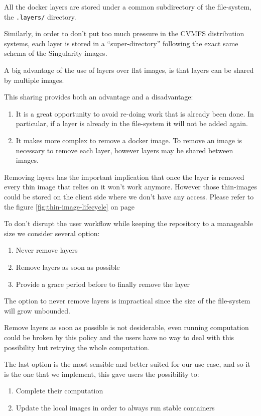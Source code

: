 All the docker layers are stored under a common subdirectory of the file-system, the \texttt{.layers/} directory.

Similarly, in order to don’t put too much pressure in the CVMFS distribution systems, each layer is stored in a “super-directory” following the exact same schema of the Singularity images.

A big advantage of the use of layers over flat images, is that layers can be shared by multiple images.

This sharing provides both an advantage and a disadvantage:
\begin{enumerate}
        \item It is a great opportunity to avoid re-doing work that is already been done. In particular, if a layer is already in the file-system it will not be added again.
        \item It makes more complex to remove a docker image. To remove an image is necessary to remove each layer, however layers may be shared between images.
\end{enumerate}

Removing layers has the important implication that once the layer is removed every thin image that relies on it won’t work anymore.
However those thin-images could be stored on the client side where we don’t have any access.
Please refer to the figure \ref{fig:thin-image-lifecycle} on page \pageref{fig:thin-image-lifecycle}

To don't disrupt the user workflow while keeping the repository to a manageable size we consider several option:
\begin{enumerate}
\item Never remove layers
\item Remove layers as soon as possible
\item Provide a grace period before to finally remove the layer
\end{enumerate}

The option to never remove layers is impractical since the size of the file-system will grow unbounded.

Remove layers as soon as possible is not desiderable, even running computation could be broken by this policy and the users have no way to deal with this possibility but retrying the whole computation.

The last option is the most sensible and better suited for our use case, and so it is the one that we implement, this gave users the possibility to:
\begin{enumerate}
\item Complete their computation
\item Update the local images in order to always run stable containers
\end{enumerate}

